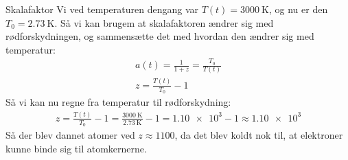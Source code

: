 \documentclass[crop=false, class=memoir]{standalone}
\begin{document}
\begin{opgave}{Skalafaktor}
	Vi ved temperaturen dengang var $T(t) = \SI{3000}{\kelvin}$, og nu er den $T_0 = \SI{2.73}{\kelvin}$. Så vi kan brugem at skalafaktoren ændrer sig med rødforskydningen, og sammensætte det med hvordan den ændrer sig med temperatur:
	\begin{align}
	    a(t) = \frac{1}{1+z} = \frac{T_0}{T(t)}\\
	    z = \frac{T(t)}{T_0} - 1
	\end{align}{}
	Så vi kan nu regne fra temperatur til rødforskydning:
	\begin{align}
	    z = \frac{T(t)}{T_0} - 1 = \frac{\SI{3000}{\kelvin}}{\SI{2.73}{\kelvin}} - 1= \num{1.10e3} - 1 \approx \num{1.10e3}
	\end{align}
	Så der blev dannet atomer ved $z \approx 1100$, da det blev koldt nok til, at elektroner kunne binde sig til atomkernerne.
\end{opgave}
\end{document}

